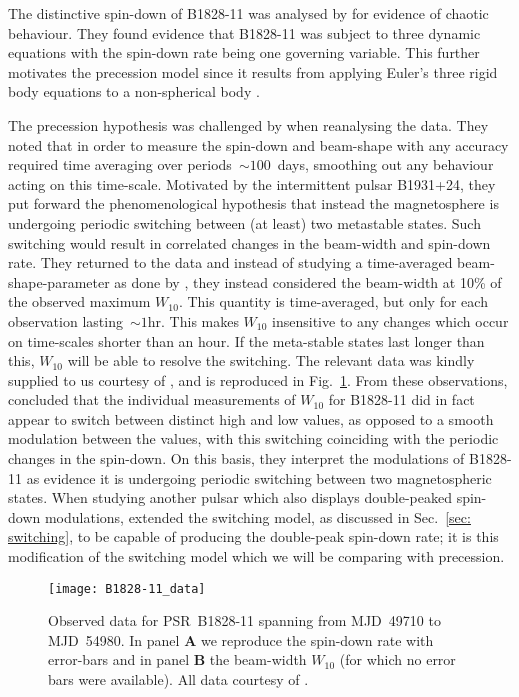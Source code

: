 \documentclass[../full_thesis/full_thesis.tex]{subfiles}
\begin{document}
The distinctive spin-down of B1828-11 was analysed by \citet{Seymour2013} for
evidence of chaotic behaviour. They found evidence that B1828-11 was subject to
three dynamic equations with the spin-down rate being one governing variable.
This further motivates the precession model since it results from applying
Euler's three rigid body equations to a non-spherical body \citep{Landau1969}.

The precession hypothesis was challenged by \citet{Lyne2010} when reanalysing
the data.   They noted that in order to measure the spin-down and beam-shape
with any accuracy required time averaging over periods~$\sim100$~days,
smoothing out any behaviour acting on this time-scale. Motivated by the
intermittent pulsar B1931+24, they put forward the phenomenological hypothesis
that instead the magnetosphere is undergoing periodic switching between (at
least) two metastable states. Such switching would result in correlated changes
in the beam-width and spin-down rate. They returned to the data and instead of
studying a time-averaged beam-shape-parameter as done by \citet{Stairs2000},
they instead considered the beam-width at 10\% of the observed maximum
$W_{10}$. This quantity is time-averaged, but only for each observation
lasting~$\sim1$hr. This makes $W_{10}$ insensitive to any changes which occur on
time-scales shorter than an hour. If the meta-stable states last longer than
this, $W_{10}$ will be able to resolve the switching. The  relevant data was
kindly supplied to us courtesy of \citet{Lyne2010}, and is reproduced in
Fig.~\ref{fig: B1828-11 data}. From these observations,
\citet{Lyne2010} concluded that the individual measurements of $W_{10}$ for
B1828-11 did in fact appear to switch between distinct high and low values, as
opposed to a smooth modulation between the values, with this switching
coinciding with the periodic changes in the spin-down. On this basis, they
interpret the modulations of B1828-11 as evidence it is undergoing periodic
switching between two magnetospheric states. When studying another pulsar which
also displays double-peaked spin-down modulations, \citet{Perera2015} extended
the switching model, as discussed in Sec.~\ref{sec: switching}, to be capable
of producing the double-peak spin-down rate; it is this modification of the
switching model which we will be comparing with precession.

\begin{figure}
\centering
\texttt{[image: B1828-11\_data]}
\caption{Observed data for PSR~B1828-11 spanning from MJD~49710 to MJD~54980.
         In panel $\textbf{A}$ we reproduce the spin-down rate with error-bars
         and in panel $\textbf{B}$ the beam-width $W_{10}$
          (for which no error bars were available). All data
         courtesy of \citet{Lyne2010}.}
\label{fig: B1828-11 data}
\end{figure}
\end{document}
